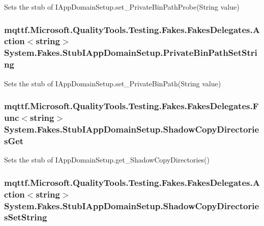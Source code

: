 Sets the stub of I\-App\-Domain\-Setup.\-set\-\_\-\-Private\-Bin\-Path\-Probe(\-String value)

\hypertarget{class_system_1_1_fakes_1_1_stub_i_app_domain_setup_a036e4f3a660bbc42a43c6c77caa73008}{
\subsubsection[{Private\-Bin\-Path\-Set\-String}]{\setlength{\rightskip}{0pt plus 5cm}mqttf.\-Microsoft.\-Quality\-Tools.\-Testing.\-Fakes.\-Fakes\-Delegates.\-Action$<$string$>$ System.\-Fakes.\-Stub\-I\-App\-Domain\-Setup.\-Private\-Bin\-Path\-Set\-String}}\label{class_system_1_1_fakes_1_1_stub_i_app_domain_setup_a036e4f3a660bbc42a43c6c77caa73008}


Sets the stub of I\-App\-Domain\-Setup.\-set\-\_\-\-Private\-Bin\-Path(\-String value)

\hypertarget{class_system_1_1_fakes_1_1_stub_i_app_domain_setup_a07b0ae7860ed18e4aa3e48d8dec08e29}{
\subsubsection[{Shadow\-Copy\-Directories\-Get}]{\setlength{\rightskip}{0pt plus 5cm}mqttf.\-Microsoft.\-Quality\-Tools.\-Testing.\-Fakes.\-Fakes\-Delegates.\-Func$<$string$>$ System.\-Fakes.\-Stub\-I\-App\-Domain\-Setup.\-Shadow\-Copy\-Directories\-Get}}\label{class_system_1_1_fakes_1_1_stub_i_app_domain_setup_a07b0ae7860ed18e4aa3e48d8dec08e29}


Sets the stub of I\-App\-Domain\-Setup.\-get\-\_\-\-Shadow\-Copy\-Directories()

\hypertarget{class_system_1_1_fakes_1_1_stub_i_app_domain_setup_a4e84fad0a904a5ee396596f4b45a23d7}{
\subsubsection[{Shadow\-Copy\-Directories\-Set\-String}]{\setlength{\rightskip}{0pt plus 5cm}mqttf.\-Microsoft.\-Quality\-Tools.\-Testing.\-Fakes.\-Fakes\-Delegates.\-Action$<$string$>$ System.\-Fakes.\-Stub\-I\-App\-Domain\-Setup.\-Shadow\-Copy\-Directories\-Set\-String}}\label{class_system_1_1_fakes_1_1_stub_i_app_domain_setup_a4e84fad0a904a5ee396596f4b45a23d7}


